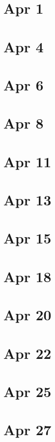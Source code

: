 \documentclass[12pt]{book}
\newcommand{\<}{\langle}
\renewcommand{\>}{\rangle}
\numberwithin{equation}{section}
\theoremstyle{plain}
\theoremstyle{definition}
\theoremstyle{remark}
\begin{document}
\section*{Apr 1}

\section*{Apr 4}

\section*{Apr 6}

\section*{Apr 8}

\section*{Apr 11}

\section*{Apr 13}

\section*{Apr 15}

\section*{Apr 18}

\section*{Apr 20}

\section*{Apr 22}

\section*{Apr 25}

\section*{Apr 27}
\end{document}
